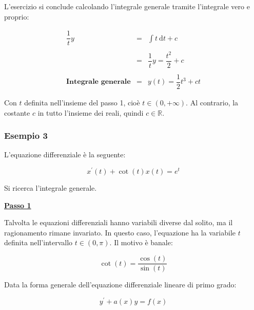 \documentclass[a4paper]{article}
\begin{document}
	\noindent
	L'esercizio si conclude calcolando l'integrale generale tramite l'integrale vero e proprio:
	
	\begin{equation*}
		\begin{array}{rll}
			\dfrac{1}{t}y				& = &	\displaystyle\int t \: \mathrm{d}t + c \\
			&& \\
										& = &	\dfrac{1}{t}y = \dfrac{t^{2}}{2} + c \\
			&& \\
			\textbf{Integrale generale}	& = &	y\left(t\right) = \dfrac{1}{2} t^{3} + ct
		\end{array}
	\end{equation*}

	\noindent
	Con $t$ definita nell'insieme del passo 1, cioè $t \in \left(0, +\infty\right)$. Al contrario, la costante $c$ in tutto l'insieme dei reali, quindi $c \in \mathbb{R}$.
	
	\newpage
	
	\subsubsection[Esempio 3]{\textcolor{Green4}{\textbf{Esempio 3}}}
	
	L'equazione differenziale è la seguente:
	
	\begin{equation*}
		x^{'}\left(t\right) + \cot \left(t\right) x\left(t\right) = e^{t}
	\end{equation*}

	Si ricerca l'integrale generale.\newline
	
	\noindent
	\textcolor{Red3}{\textbf{\underline{Passo 1}}}\newline
	
	\noindent
	Talvolta le equazioni differenziali hanno variabili diverse dal solito, ma il ragionamento rimane invariato. In questo caso, l'equazione ha la variabile $t$ definita nell'intervallo $t \in \left(0, \pi\right)$. Il motivo è banale:
	
	\begin{equation*}
		\cot\left(t\right) = \dfrac{\cos\left(t\right)}{\sin\left(t\right)}
	\end{equation*}

	\noindent
	Data la forma generale dell'equazione differenziale lineare di primo grado:
	
	\begin{equation*}
		y^{'} + a\left(x\right) y = f\left(x\right)
	\end{equation*}
\end{document}
